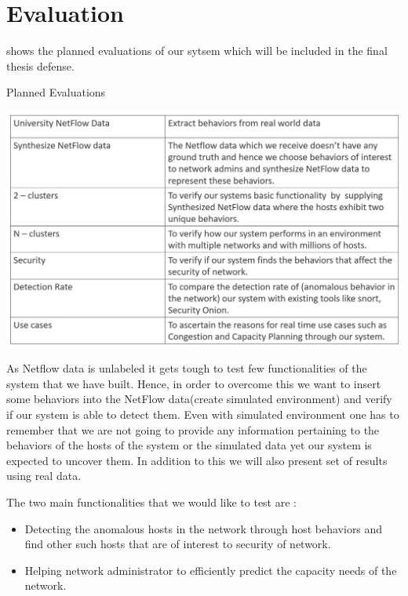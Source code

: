 \section{Evaluation}

 shows the planned evaluations of our sytsem which will be included in the final thesis defense.

\begin{table}[b]
		\caption{Planned Evaluations}%
	\centerline{\includegraphics[scale = 0.6]{evaluation.png}}
\end{table}


As Netflow data is unlabeled it gets tough to test few functionalities of the system
that we have built. Hence, in order to overcome this we want to insert some behaviors
into the NetFlow data(create simulated environment) and verify if our system is able to
detect them. Even with simulated environment one has to remember that we are not going
to provide any information pertaining to the behaviors of the hosts of the system or the
simulated data yet our system is expected to uncover them. In addition to this we will also
present set of results using real data.




The two main functionalities that we would like to test are :
\begin{itemize}
	
	\item Detecting the anomalous hosts in the network through host behaviors and find other
	such hosts that are of interest to security of network.
	
	\item Helping network administrator to efficiently predict the capacity needs of the network.
\end{itemize}

